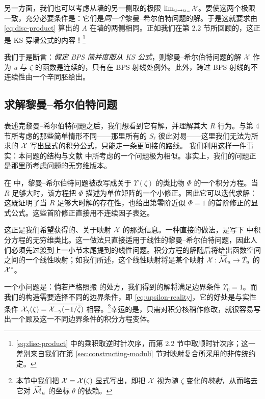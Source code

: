 另一方面，我们也可以考虑从墙的另一侧取的极限 $\lim_{u\to u_w}\mathcal{X}$。要使这两个极限一致，充分必要条件是：它们是\emph{同一个}黎曼--希尔伯特问题的解。于是这就要求由 \eqref{eq:disc-product} 算出的 $A$ 在墙的两侧相同。正如我们在第 2.2 节所回顾的，这正是 KS 穿墙公式的内容！\footnote{\eqref{eq:disc-product} 中的乘积取逆时针次序，而第 2.2 节中取顺时针次序；这一差别来自我们在第 \ref{sec:constructing-moduli} 节对映射复合所采用的非传统约定。}%

我们于是断言：\emph{假定 BPS 简并度服从 KS 公式}，则黎曼--希尔伯特问题的解 $\mathcal{X}$ 作为 $u$ 与 $\zeta$ 的函数是连续的，只有在 BPS 射线处例外。此外，跨过 BPS 射线的不连续性由一个辛同胚给出。

\subsection{求解黎曼--希尔伯特问题} \label{sec:solving-rh}

表述完黎曼--希尔伯特问题之后，我们想看到它有解，并理解其大 $R$ 行为。与第 4 节所考虑的那些简单情形不同——那里所有的 $S_\ell$ 彼此对易——这里我们无法为所求的 $\mathcal{X}$ 写出显式的积分公式，只能走一条更间接的路线。%
我们利用这样一件事实：本问题的结构与文献 \cite{MR1213301,Cecotti:1993rm} 中所考虑的一个问题极为相似。事实上，我们的问题正是那里所考虑问题的无穷维版本。

在 \cite{Cecotti:1993rm} 中，黎曼--希尔伯特问题被改写成关于 $\Upsilon(\zeta)$ 的类比物 $\Phi$ 的一个积分方程。当 $R$ 足够大时，该方程把 $\Phi$ 描述为单位矩阵的一个小修正。因此它可以迭代求解：这既证明了当 $R$ 足够大时解的存在性，也给出第零阶近似 $\Phi=1$ 的首阶修正的显式公式。这些首阶修正直接用不连续因子表达。

这正是我们希望获得的、关于映射 $\mathcal{X}$ 的那类信息。一种直接的做法，是写下 \cite{Cecotti:1993rm} 中积分方程的无穷维类比。这一做法只直接适用于线性的黎曼--希尔伯特问题，因此人们必须先过渡到上一小节末尾提到的线性问题。积分方程的解随后将给出函数空间之间的一个线性映射；如我们所述，这个线性映射将是某个映射 $\mathcal{X}:\widetilde{\mathcal{M}}_u\to\tilde T_u$ 的 $\mathcal{X}^*$。

一个小问题是：倘若严格照搬 \cite{Cecotti:1993rm} 的处方，我们得到的解将满足边界条件 $\Upsilon_0=1$。而我们的构造需要选择不同的边界条件，即 \eqref{eq:upsilon-reality}，它的好处是与实性条件 $\mathcal{X}_\gamma(\zeta)=\overline{\mathcal{X}_{-\gamma}(-1/\bar\zeta)}$ 相容。\footnote{本节中我们把 $\mathcal{X}=\mathcal{X}(\zeta)$ 显式写出，即把 $\mathcal{X}$ 视为随 $\zeta$ 变化的\emph{映射}，从而略去它对 $\widetilde{\mathcal{M}}_u$ 的坐标 $\theta$ 的依赖。}幸运的是，只需对积分核稍作修改，就很容易写出一个顾及这一不同边界条件的积分方程变体。

